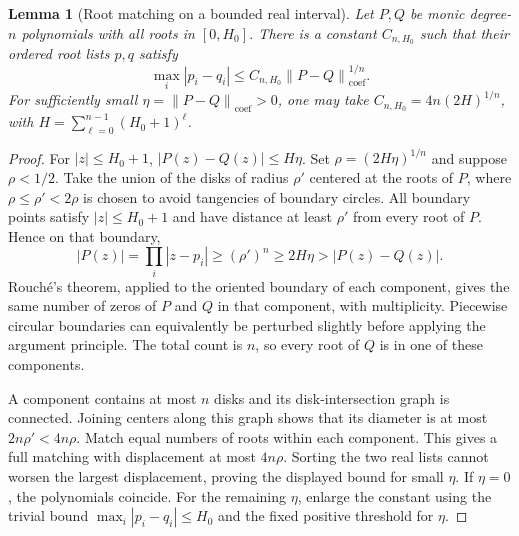 \documentclass[11pt,a4paper]{article}
\numberwithin{equation}{section}
\newtheorem{lemma}[lemma]{Lemma}
\theoremstyle{definition}
\theoremstyle{remark}
\newcommand{\norm}[1]{\left\lVert#1\right\rVert}
\newcommand{\coef}{\operatorname{coef}}
\begin{document}
\begin{lemma}[Root matching on a bounded real interval]
\label{lem:root-match}
Let $P,Q$ be monic degree-$n$ polynomials with all roots in $[0,H_0]$.
There is a constant $C_{n,H_0}$ such that their ordered root lists $p,q$ satisfy
\begin{equation}
 \max_i|p_i-q_i|\le C_{n,H_0}\norm{P-Q}_{\coef}^{1/n}.
 \label{eq:root-match}
\end{equation}
For sufficiently small $\eta=\norm{P-Q}_{\coef}>0$, one may take
$C_{n,H_0}=4n(2H)^{1/n}$, with
$H=\sum_{\ell=0}^{n-1}(H_0+1)^\ell$.
\end{lemma}
\begin{proof}
For $|z|\le H_0+1$,
$|P(z)-Q(z)|\le H\eta$.  Set $\rho=(2H\eta)^{1/n}$ and suppose $\rho<1/2$.
Take the union of the disks of radius $\rho'$ centered at the roots of $P$, where
$\rho\le\rho'<2\rho$ is chosen to avoid tangencies of boundary circles.  All
boundary points satisfy $|z|\le H_0+1$ and have distance at least $\rho'$ from
every root of $P$.  Hence on that boundary,
\[
 |P(z)|=\prod_i|z-p_i|\ge(\rho')^n\ge2H\eta>|P(z)-Q(z)|.
\]
Rouch\'e's theorem, applied to the oriented boundary of each component, gives
the same number of zeros of $P$ and $Q$ in that component, with multiplicity.
Piecewise circular boundaries can equivalently be perturbed slightly before
applying the argument principle.  The total count is $n$, so every root of $Q$
is in one of these components.

A component contains at most $n$ disks and its disk-intersection graph is
connected.  Joining centers along this graph shows that its diameter is at most
$2n\rho'<4n\rho$.  Match equal numbers of roots within each component.  This gives
a full matching with displacement at most $4n\rho$.  Sorting the two real lists
cannot worsen the largest displacement, proving the displayed bound for small
$\eta$.  If $\eta=0$, the polynomials coincide.  For the remaining $\eta$, enlarge
the constant using the trivial bound $\max_i|p_i-q_i|\le H_0$ and the fixed
positive threshold for $\eta$.
\end{proof}
\end{document}
